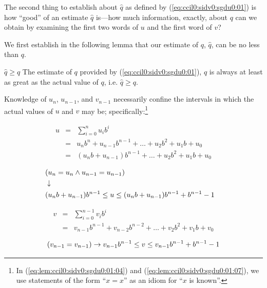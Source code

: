 The second thing to establish about $\hat{q}$ as defined by 
(\ref{eq:ccil0:sidv0:sgdu0:01}) is how ``good'' of an estimate 
$\hat{q}$ is---how much information, exactly, about $q$ can we
obtain by examining the first two words of $u$ and the first
word of $v$?

We first establish in the following lemma that our estimate of
$q$, $\hat{q}$, can be no less than $q$.

\begin{vworklemmastatementpar}{\mbox{\boldmath$\hat{q} \geq q$}}
\label{lem:ccil0:sidv0:sgdu0:01}
The estimate of $q$ provided by (\ref{eq:ccil0:sidv0:sgdu0:01}),
$\hat{q}$ is always at least as great as the actual value of 
$q$, i.e. $\hat{q} \geq q$.
\end{vworklemmastatementpar}
\begin{vworklemmaproof}
Knowledge of $u_{n}$, $u_{n-1}$, and $v_{n-1}$ necessarily confine
the intervals in which the actual values of $u$ and $v$ may be;
specifically:\footnote{In
(\ref{eq:lem:ccil0:sidv0:sgdu0:01:04})
and 
(\ref{eq:lem:ccil0:sidv0:sgdu0:01:07}),
we use statements of the form ``$x = x$'' as an idiom for
``$x$ is known''.}

\begin{eqnarray}
\label{eq:lem:ccil0:sidv0:sgdu0:01:01}
u & = & \sum_{i=0}^{n} u_i b^i   \\
\label{eq:lem:ccil0:sidv0:sgdu0:01:02}
  & = & u_n b^n + u_{n-1} b^{n-1} + \ldots{} + u_2 b^2 + u_1 b + u_0   \\
\label{eq:lem:ccil0:sidv0:sgdu0:01:03}
  & = & (u_n b + u_{n-1}) b^{n-1} + \ldots{} + u_2 b^2 + u_1 b + u_0
\end{eqnarray}

\begin{eqnarray}
\nonumber & (u_n = u_n \wedge u_{n-1} = u_{n-1}) & \\
\label{eq:lem:ccil0:sidv0:sgdu0:01:04}
& \downarrow & \\
\nonumber & (u_n b + u_{n-1}) b^{n-1} \leq u \leq (u_n b + u_{n-1}) b^{n-1} + b^{n-1} - 1 &
\end{eqnarray}

\begin{eqnarray}
\label{eq:lem:ccil0:sidv0:sgdu0:01:05}
v & = & \sum_{i=0}^{n-1} v_i b^i   \\
\label{eq:lem:ccil0:sidv0:sgdu0:01:06}
& = & v_{n-1} b^{n-1} + v_{n-2} b^{n-2} + \ldots{} + v_2 b^2 + v_1 b + v_0 
\end{eqnarray}

\begin{equation}
\label{eq:lem:ccil0:sidv0:sgdu0:01:07}
(v_{n-1} = v_{n-1})
\to
v_{n-1} b^{n-1} \leq v \leq v_{n-1} b^{n-1} + b^{n-1} - 1 
\end{equation}


\end{vworklemmaproof}
